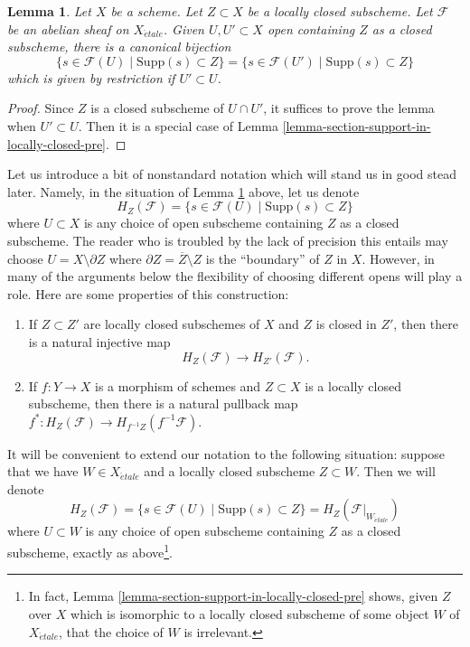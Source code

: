 \documentclass{stacks-project}
\theoremstyle{plain}
\newtheorem{lemma}[subsection]{Lemma}
\theoremstyle{definition}
\theoremstyle{remark}
\numberwithin{equation}{subsection}
\def\etale{{\acute{e}tale}}
\begin{document}
\begin{lemma}
\label{lemma-section-support-in-locally-closed}
Let $X$ be a scheme. Let $Z \subset X$ be a locally closed subscheme.
Let $\mathcal{F}$ be an abelian sheaf on $X_\etale$. Given
$U, U' \subset X$ open containing $Z$ as a closed subscheme,
there is a canonical bijection
$$
\{s \in \mathcal{F}(U) \mid \text{Supp}(s) \subset Z\} =
\{s \in \mathcal{F}(U') \mid \text{Supp}(s) \subset Z\}
$$
which is given by restriction if $U' \subset U$.
\end{lemma}

\begin{proof}
Since $Z$ is a closed subscheme of $U \cap U'$, it suffices to
prove the lemma when $U' \subset U$. Then it is a special case
of Lemma \ref{lemma-section-support-in-locally-closed-pre}.
\end{proof}

\noindent
Let us introduce a bit of nonstandard notation which will stand us
in good stead later. Namely, in the situation of
Lemma \ref{lemma-section-support-in-locally-closed} above, let us denote
$$
H_Z(\mathcal{F}) = \{s \in \mathcal{F}(U) \mid \text{Supp}(s) \subset Z\}
$$
where $U \subset X$ is any choice of open subscheme containing $Z$ as a closed
subscheme. The reader who is troubled by the lack of precision this entails
may choose $U = X \setminus \partial Z$ where
$\partial Z = \overline{Z}\setminus Z$ is the ``boundary'' of $Z$ in $X$.
However, in many of the arguments below the flexibility of choosing
different opens will play a role. Here are some properties of this
construction:
\begin{enumerate}
\item
\label{item-inclusion}
If $Z \subset Z'$ are locally closed subschemes of $X$ and $Z$ is
closed in $Z'$, then there is a natural injective map
$$
H_Z(\mathcal{F}) \to H_{Z'}(\mathcal{F}).
$$
\item
\label{item-pullback}
If $f : Y \to X$ is a morphism of schemes and $Z \subset X$ is a locally
closed subscheme, then there is a natural
pullback map $f^* : H_Z(\mathcal{F}) \to H_{f^{-1}Z}(f^{-1}\mathcal{F})$.
\end{enumerate}
It will be convenient to extend our notation to the following situation:
suppose that we have $W \in X_\etale$ and a locally closed subscheme
$Z \subset W$. Then we will denote
$$
H_Z(\mathcal{F}) =
\{s \in \mathcal{F}(U) \mid \text{Supp}(s) \subset Z\} =
H_Z(\mathcal{F}|_{W_\etale})
$$
where $U \subset W$ is any choice of open subscheme containing $Z$
as a closed subscheme, exactly as above\footnote{In fact,
Lemma \ref{lemma-section-support-in-locally-closed-pre}
shows, given $Z$ over $X$ which is isomorphic to a locally closed
subscheme of some object $W$ of $X_\etale$, that
the choice of $W$ is irrelevant.}.
\end{document}
